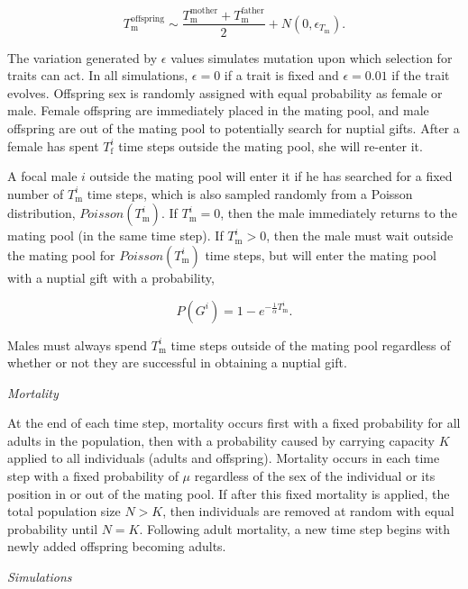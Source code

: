 \documentclass[
]{article}
\begin{document}
\[T^{\mathrm{offspring}}_{\mathrm{m}} \sim \frac{T^{\mathrm{mother}}_{\mathrm{m}}  + T^{\mathrm{father}}_{\mathrm{m}}}{2} + N\left(0, \epsilon_{T_{\mathrm{m}}} \right).\]

The variation generated by \(\epsilon\) values simulates mutation upon
which selection for traits can act. In all simulations, \(\epsilon = 0\)
if a trait is fixed and \(\epsilon = 0.01\) if the trait evolves.
Offspring sex is randomly assigned with equal probability as female or
male. Female offspring are immediately placed in the mating pool, and
male offspring are out of the mating pool to potentially search for
nuptial gifts. After a female has spent \(T^{i}_{\mathrm{f}}\) time
steps outside the mating pool, she will re-enter it.

A focal male \(i\) outside the mating pool will enter it if he has
searched for a fixed number of \(T^{i}_{\mathrm{m}}\) time steps, which
is also sampled randomly from a Poisson distribution,
\(Poisson(T^{i}_{\mathrm{m}})\). If \(T^{i}_{\mathrm{m}} = 0\), then the
male immediately returns to the mating pool (in the same time step). If
\(T^{i}_{\mathrm{m}} > 0\), then the male must wait outside the mating
pool for \(Poisson(T^{i}_{\mathrm{m}})\) time steps, but will enter the
mating pool with a nuptial gift with a probability,

\[P(G^{i}) = 1 - e^{-\frac{1}{\alpha}T^{i}_{\mathrm{m}}}.\]

Males must always spend \(T^{i}_{\mathrm{m}}\) time steps outside of the
mating pool regardless of whether or not they are successful in
obtaining a nuptial gift.

\emph{Mortality}

At the end of each time step, mortality occurs first with a fixed
probability for all adults in the population, then with a probability
caused by carrying capacity \(K\) applied to all individuals (adults and
offspring). Mortality occurs in each time step with a fixed probability
of \(\mu\) regardless of the sex of the individual or its position in or
out of the mating pool. If after this fixed mortality is applied, the
total population size \(N > K\), then individuals are removed at random
with equal probability until \(N = K\). Following adult mortality, a new
time step begins with newly added offspring becoming adults.

\emph{Simulations}
\end{document}
